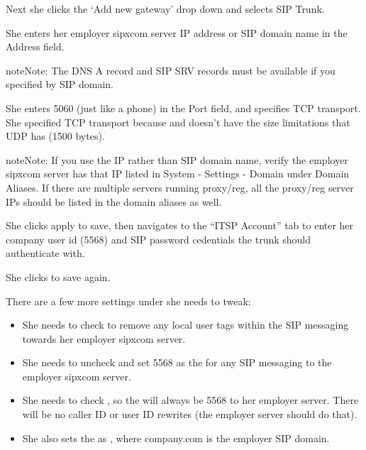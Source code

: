 \documentclass[letterpaper,10pt,english]{sphinxmanual}
\begin{document}
Next she clicks the ‘Add new gateway’ drop down and selects SIP Trunk.


She enters her employer sipxcom server IP address or SIP domain name in the Address field.

\begin{sphinxadmonition}{note}{Note:}
The DNS A record and SIP SRV records must be available if you specified by SIP domain.
\end{sphinxadmonition}

She enters 5060 (just like a phone) in the Port field, and specifies TCP transport.
She specified TCP transport because  and doesn’t have the size limitations that UDP has (1500 bytes).

\begin{sphinxadmonition}{note}{Note:}
If you use the IP rather than SIP domain name, verify the employer sipxcom server has that IP listed in System - Settings - Domain under Domain Aliases.
If there are multiple servers running proxy/reg, all the proxy/reg server IPs should be listed in the domain aliases as well.
\end{sphinxadmonition}

She clicks apply to save, then navigates to the “ITSP Account” tab to enter her company user id (5568) and SIP password cedentials the trunk should authenticate with.


She clicks  to save again.

There are a few more settings under  she needs to tweak:
\begin{itemize}
\item {} 
She needs to check  to remove any local user tags within the SIP messaging towards her employer sipxcom server.

\item {} 
She needs to uncheck  and set 5568 as the  for any SIP messaging to the employer sipxcom server.

\item {} 
She needs to check , so the  will always be 5568 to her employer server. There will be no caller ID or user ID rewrites (the employer server should do that).

\item {} 
She also sets the  as , where company.com is the employer SIP domain.

\end{itemize}
\end{document}
